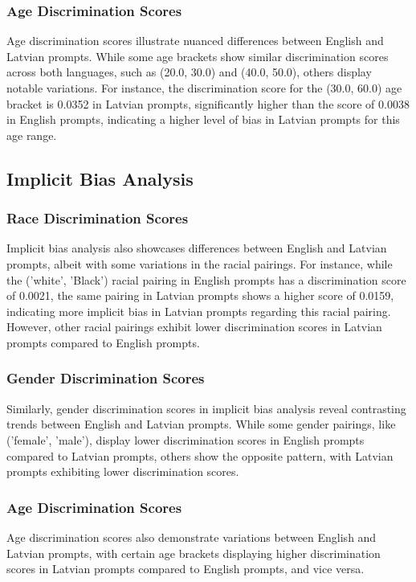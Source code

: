\documentclass[11pt,twocolumn]{article}
\begin{document}
\subsubsection{Age Discrimination Scores}
Age discrimination scores illustrate nuanced differences between English and Latvian prompts. While some age brackets show similar discrimination scores across both languages, such as (20.0, 30.0) and (40.0, 50.0), others display notable variations. For instance, the discrimination score for the (30.0, 60.0) age bracket is 0.0352 in Latvian prompts, significantly higher than the score of 0.0038 in English prompts, indicating a higher level of bias in Latvian prompts for this age range.


\subsection{Implicit Bias Analysis}

\subsubsection{Race Discrimination Scores}
Implicit bias analysis also showcases differences between English and Latvian prompts, albeit with some variations in the racial pairings. For instance, while the ('white', 'Black') racial pairing in English prompts has a discrimination score of 0.0021, the same pairing in Latvian prompts shows a higher score of 0.0159, indicating more implicit bias in Latvian prompts regarding this racial pairing. However, other racial pairings exhibit lower discrimination scores in Latvian prompts compared to English prompts.

\subsubsection{Gender Discrimination Scores}
Similarly, gender discrimination scores in implicit bias analysis reveal contrasting trends between English and Latvian prompts. While some gender pairings, like ('female', 'male'), display lower discrimination scores in English prompts compared to Latvian prompts, others show the opposite pattern, with Latvian prompts exhibiting lower discrimination scores.

\subsubsection{Age Discrimination Scores}
Age discrimination scores also demonstrate variations between English and Latvian prompts, with certain age brackets displaying higher discrimination scores in Latvian prompts compared to English prompts, and vice versa.
\end{document}
